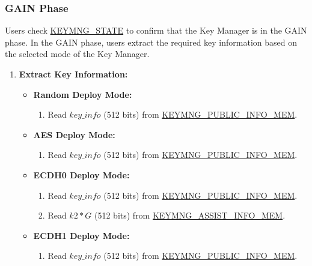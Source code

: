 \documentclass[main\_\_EN.tex]{subfiles}
\begin{document}
\subsubsection{GAIN Phase}
Users check \hyperref[fielddesc:KEYMNGSTATE]{KEYMNG\_STATE} to confirm that the Key Manager is in the GAIN phase. In the GAIN phase, users extract the required key information based on the selected mode of the Key Manager.
\begin{enumerate}
    \item \textbf{Extract Key Information:}
    \begin{itemize}
        \item \textbf{Random Deploy Mode:}
        \begin{enumerate}
            \item Read \hyperref[para:keyinfo]{\begin{math}key\_info\end{math}} (512 bits) from \hyperref[mem:keymng-public-info]{KEYMNG\_PUBLIC\_INFO\_MEM}.
        \end{enumerate}
        \item \textbf{AES Deploy Mode:}
        \begin{enumerate}
            \item Read \hyperref[para:keyinfo]{\begin{math}key\_info\end{math}} (512 bits) from \hyperref[mem:keymng-public-info]{KEYMNG\_PUBLIC\_INFO\_MEM}.
        \end{enumerate}
        \item \textbf{ECDH0 Deploy Mode:}
        \begin{enumerate}
            \item Read \hyperref[para:keyinfo]{\begin{math}key\_info\end{math}} (512 bits) from \hyperref[mem:keymng-public-info]{KEYMNG\_PUBLIC\_INFO\_MEM}.
            \item Read \begin{math}k2*G\end{math} (512 bits) from \hyperref[mem:keymng-assist-info]{KEYMNG\_ASSIST\_INFO\_MEM}.
        \end{enumerate}
        \item \textbf{ECDH1 Deploy Mode:}
        \begin{enumerate}
            \item Read \hyperref[para:keyinfo]{\begin{math}key\_info\end{math}} (512 bits) from \hyperref[mem:keymng-public-info]{KEYMNG\_PUBLIC\_INFO\_MEM}.

\end{enumerate}
\end{itemize}
\end{enumerate}
\end{document}
